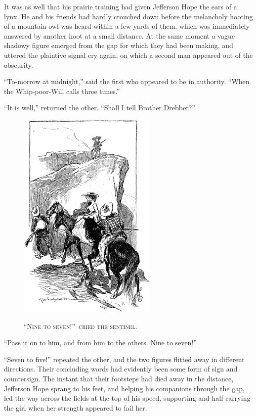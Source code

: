 \documentclass[12pt,english]{book}
\newcommand{\noun}[1]{\textsc{#1}}
\begin{document}
It was as well that his prairie training had given Jefferson Hope
the ears of a lynx. He and his friends had hardly crouched down before
the melancholy hooting of a mountain owl was heard within a few yards
of them, which was immediately answered by another hoot at a small
distance. At the same moment a vague shadowy figure emerged from the
gap for which they had been making, and uttered the plaintive signal
cry again, on which a second man appeared out of the obscurity.

{}``To-morrow at midnight,'' said the first who appeared to be in
authority. {}``When the Whip-poor-Will calls three times.''

{}``It is well,'' returned the other. {}``Shall I tell Brother
Drebber?''

%
\begin{figure}[htbp]
\noindent \begin{center}\includegraphics{images/study10-stud-20.png}\end{center}

\noindent \begin{center}\noun{{}``Nine to seven!''\ cried the
sentinel.}\end{center}
\end{figure}
{}``Pass it on to him, and from him to the others. Nine to seven!''

{}``Seven to five!'' repeated the other, and the two figures flitted
away in different directions. Their concluding words had evidently
been some form of sign and countersign. The instant that their footsteps
had died away in the distance, Jefferson Hope sprang to his feet,
and helping his companions through the gap, led the way across the
fields at the top of his speed, supporting and half-carrying the girl
when her strength appeared to fail her.
\end{document}
